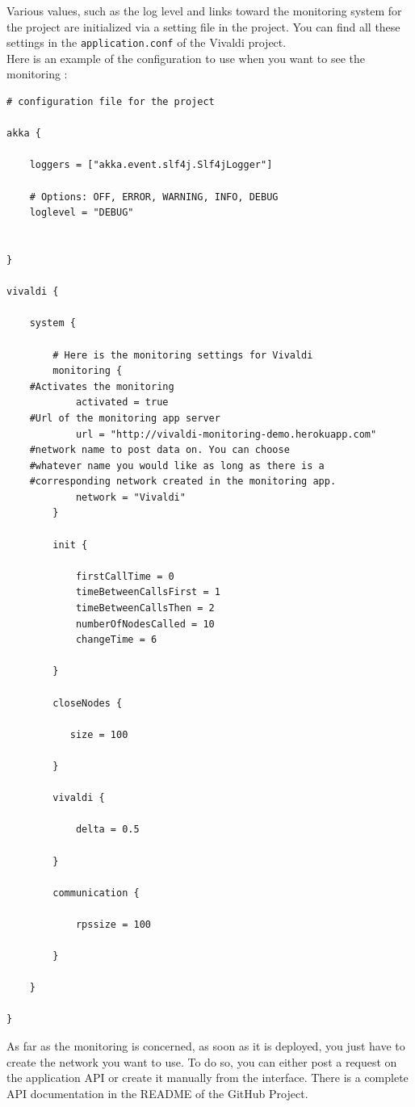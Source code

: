 \documentclass[11pt,a4paper]{article}
\begin{document}
Various values, such as the log level and links toward the monitoring system for the project are initialized via a setting file in the project. You can find all these settings in the \texttt{application.conf} of the Vivaldi project.\\
Here is an example of the  configuration to use when you want to see the monitoring :

\begin{verbatim}
# configuration file for the project

akka {

    loggers = ["akka.event.slf4j.Slf4jLogger"]

    # Options: OFF, ERROR, WARNING, INFO, DEBUG
    loglevel = "DEBUG"


}

vivaldi {

    system {

        # Here is the monitoring settings for Vivaldi
        monitoring {
	#Activates the monitoring
            activated = true
	#Url of the monitoring app server
            url = "http://vivaldi-monitoring-demo.herokuapp.com"
	#network name to post data on. You can choose
	#whatever name you would like as long as there is a 
	#corresponding network created in the monitoring app.
            network = "Vivaldi"
        }

        init {

            firstCallTime = 0
            timeBetweenCallsFirst = 1
            timeBetweenCallsThen = 2
            numberOfNodesCalled = 10
            changeTime = 6

        }

        closeNodes {

           size = 100

        }

        vivaldi {

            delta = 0.5

        }

        communication {

            rpssize = 100

        }

    }

}
\end{verbatim}

As far as the monitoring is concerned, as soon as it is deployed, you just have to create the network you want to use. To do so, you can either post a request on the application API or create it manually from the interface. There is a complete API documentation in the README of the GitHub Project. 
\end{document}
